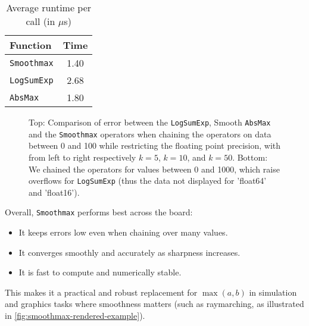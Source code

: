 \begin{table}[H]
    \centering
    \begin{tabular}{l|c}
        \toprule
        Function & Time \\
        \midrule
        \texttt{Smoothmax} & 1.40 \\
        \texttt{LogSumExp} & 2.68 \\
        \texttt{AbsMax}    & 1.80 \\
        \bottomrule
    \end{tabular}
    \caption{Average runtime per call (in $\mu$s)}
    \label{tab:smoothmax-time}
\end{table}

\begin{figure}
    \caption{Top: Comparison of error between the \texttt{LogSumExp}, Smooth \texttt{AbsMax} and the \texttt{Smoothmax} operators when chaining the operators on data between 0 and 100 while restricting the floating point precision, with from left to right respectively $k=5$, $k=10$, and $k=50$. Bottom: We chained the operators for values between 0 and 1000, which raise overflows for \texttt{LogSumExp} (thus the data not displayed for 'float64' and 'float16'). }
    \label{fig:smoothmax-precision-per-floating-point}
\end{figure}
\midConclusion

Overall, \texttt{Smoothmax} performs best across the board:
\begin{itemize}
    \item It keeps errors low even when chaining over many values.
    \item It converges smoothly and accurately as sharpness increases.
    \item It is fast to compute and numerically stable.
\end{itemize}

This makes it a practical and robust replacement for $\max(a, b)$ in simulation and graphics tasks where smoothness matters (such as raymarching, as illustrated in \cref{fig:smoothmax-rendered-example}).

